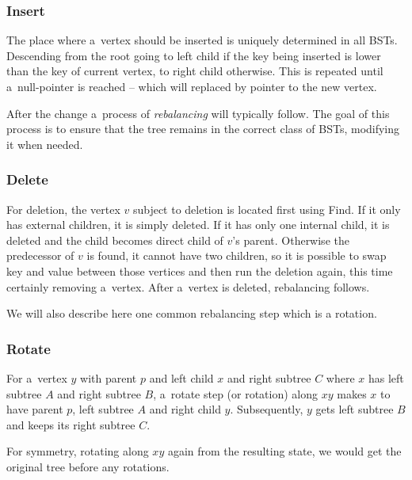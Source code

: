 \subsubsection*{Insert}
The place where a~vertex should be inserted is uniquely determined in all BSTs. Descending from the root going to left child if the key being inserted is lower than the key of current vertex, to right child otherwise. This is repeated until a~null-pointer is reached -- which will replaced by pointer to the new vertex. 

After the change a~process of \textit{rebalancing} will typically follow. The goal of this process is to ensure that the tree remains in the correct class of BSTs, modifying it when needed.

\subsubsection*{Delete}
For deletion, the vertex $v$ subject to deletion is located first using Find. If it only has external children, it is simply deleted. If it has only one internal child, it is deleted and the child becomes direct child of $v$'s parent. Otherwise the predecessor of $v$ is found, it cannot have two children, so it is possible to swap key and value between those vertices and then run the deletion again, this time certainly removing a~vertex. After a~vertex is deleted, rebalancing follows.

We will also describe here one common rebalancing step which is a rotation.

\subsubsection*{Rotate}

For a~vertex $y$ with parent $p$ and left child $x$ and right subtree $C$ where $x$ has left subtree $A$ and right subtree $B$, a~rotate step (or rotation) along $xy$ makes $x$ to have parent $p$, left subtree $A$ and right child $y$. Subsequently, $y$ gets left subtree $B$ and keeps its right subtree $C$.

For symmetry, rotating along $xy$ again from the resulting state, we would get the original tree before any rotations.


